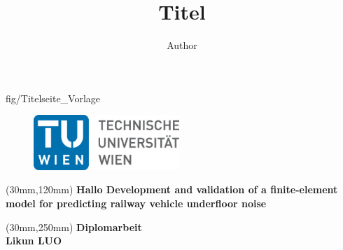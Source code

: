 \author{Author}
\title{Titel}
				
\thispagestyle{empty}							

\TileWallPaper {\paperwidth }{\paperheight } {fig/Titelseite_Vorlage}	%

\begin{flushleft}

	\begin{figure}[htbp]
		\begin{minipage}[b]{.5\linewidth}
			\begin{flushleft}
				\hspace{5mm}
				\includegraphics[width=5.5cm]{fig/TU_Logo}		
			\end{flushleft}
		\end{minipage}
	\end{figure}


 \begin{spacing}{2.5}
     	\begin{textblock*}{14cm}(30mm,120mm)
        \textbf{\Huge Hallo Development and validation of a finite-element model for predicting railway vehicle underfloor noise}
	\end{textblock*}
 \end{spacing}

	
	\begin{textblock*}{14cm}(30mm,250mm)
		\textbf{\large Diplomarbeit} \\[3mm]
		\textbf{\huge Likun LUO}
	\end{textblock*}

\end{flushleft}
